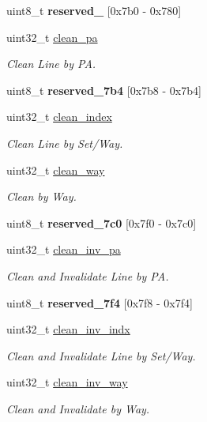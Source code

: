 \begin{DoxyCompactItemize}
uint8\+\_\+t {\bfseries reserved\+\_} \mbox{[}0x7b0 -\/ 0x780\mbox{]}
\item 
uint32\+\_\+t \mbox{\hyperlink{group__L2C-310__cache_gad73834dceb6b3f92e1f86f409b2749a6}{clean\+\_\+pa}}
\begin{DoxyCompactList}\small\item\em Clean Line by PA. \end{DoxyCompactList}\item 
uint8\+\_\+t {\bfseries reserved\+\_\+7b4} \mbox{[}0x7b8 -\/ 0x7b4\mbox{]}
\item 
uint32\+\_\+t \mbox{\hyperlink{group__L2C-310__cache_ga966f3adfeb498ab72596f507ac5451d0}{clean\+\_\+index}}
\begin{DoxyCompactList}\small\item\em Clean Line by Set/\+Way. \end{DoxyCompactList}\item 
uint32\+\_\+t \mbox{\hyperlink{group__L2C-310__cache_ga53e9a59e6f64df7e8ad23b8c68369fa5}{clean\+\_\+way}}
\begin{DoxyCompactList}\small\item\em Clean by Way. \end{DoxyCompactList}\item 
uint8\+\_\+t {\bfseries reserved\+\_\+7c0} \mbox{[}0x7f0 -\/ 0x7c0\mbox{]}
\item 
uint32\+\_\+t \mbox{\hyperlink{group__L2C-310__cache_ga82e830a23bbe0454ede493b04dc55499}{clean\+\_\+inv\+\_\+pa}}
\begin{DoxyCompactList}\small\item\em Clean and Invalidate Line by PA. \end{DoxyCompactList}\item 
uint8\+\_\+t {\bfseries reserved\+\_\+7f4} \mbox{[}0x7f8 -\/ 0x7f4\mbox{]}
\item 
uint32\+\_\+t \mbox{\hyperlink{group__L2C-310__cache_gaae790cb415296d7967a209a51e4c1112}{clean\+\_\+inv\+\_\+indx}}
\begin{DoxyCompactList}\small\item\em Clean and Invalidate Line by Set/\+Way. \end{DoxyCompactList}\item 
uint32\+\_\+t \mbox{\hyperlink{group__L2C-310__cache_ga8ac32cdc984ec4cb4a39af324fceb45b}{clean\+\_\+inv\+\_\+way}}
\begin{DoxyCompactList}\small\item\em Clean and Invalidate by Way. \end{DoxyCompactList}\item 

\end{DoxyCompactItemize}
